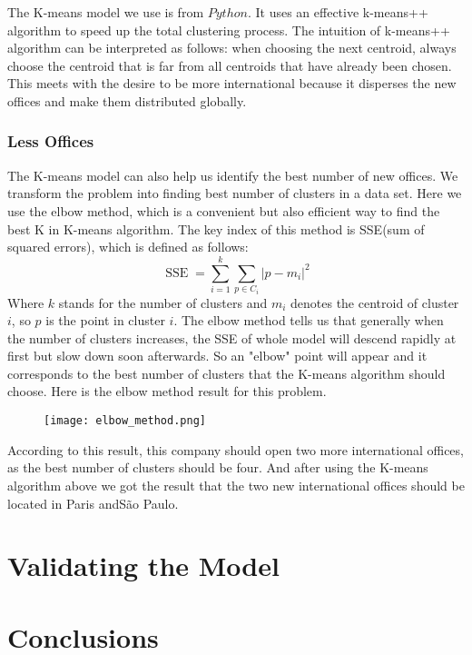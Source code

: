 \documentclass{mcmthesis}
\begin{document}
  \indent The K-means model we use is from $Python$. It uses an effective k-means++ algorithm to speed up the total clustering process. The intuition of k-means++ algorithm can be interpreted as follows: when choosing the next centroid, always choose the centroid that is far from all centroids that have already been chosen. This meets with the desire to be more international because it disperses the new offices and make them distributed globally. 

  \subsubsection{Less Offices}

  \indent \indent The K-means model can also help us identify the best number of new offices. We transform the problem into finding best number of clusters in a data set. Here we use the elbow method, which is a convenient but also efficient way to find the best K in K-means algorithm. The key index of this method is SSE(sum of squared errors), which is defined as follows:
  \begin{equation}
    \mathop{SSE} = \sum^k_{i=1}\sum_{p\in C_i}\left|p-m_i\right|^2
  \end{equation}
  \indent Where $k$ stands for the number of clusters and $m_i$ denotes the centroid of cluster $i$, so $p$ is the point in cluster $i$. The elbow method tells us that generally when the number of clusters increases, the SSE of whole model will descend rapidly at first but slow down soon afterwards. So an "elbow" point will appear and it corresponds to the best number of clusters that the K-means algorithm should choose. Here is the elbow method result for this problem.

  \begin{figure}
    \small
    \centering
    \texttt{[image: elbow\_method.png]}
  \end{figure}
  \newpage

  \indent According to this result, this company should open two more international offices, as the best number of clusters should be four. And after using the K-means algorithm above we got the result that the two new international offices should be located in Paris andSão Paulo.
  
\section{Validating the Model}

\section{Conclusions}
\end{document}
